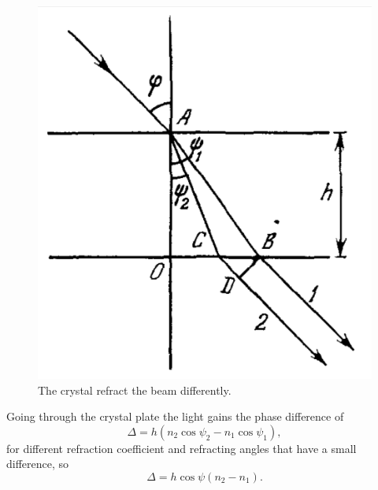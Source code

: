 \begin{minipage}{0.35\textwidth}
    \begin{figure}[h]
    \centering
    \includegraphics[width=1\textwidth]{images/intercolor.png}
    \caption{The crystal refract the beam differently.}
\end{figure}
\end{minipage}
\hfill
\begin{minipage}{0.55\textwidth}
    Going through the crystal plate the light gains the phase difference of
    \begin{equation*}
    	\Delta = h (n_2 \cos \psi_2 - n_1 \cos \psi_1),
    \end{equation*}
    for different refraction coefficient and refracting angles that have a small difference, so
    \begin{equation*}
    	\Delta = h \cos \psi (n_2 - n_1).
    \end{equation*}
\end{minipage}
